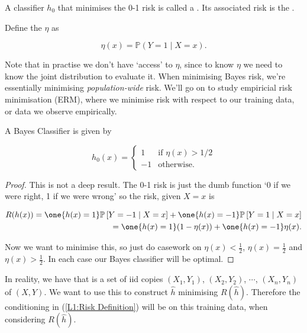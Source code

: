 \documentclass[11pt]{scrartcl}
\begin{document}
A classifier $h_0$ that minimises the 0-1 risk is called a . Its associated risk is the .

Define the  $\eta$ as 

\begin{equation}
    \eta(x) = \mathbb{P}(Y=1\mid X=x).
    \label{L1:Regression Function}
\end{equation}

Note that in practise we don't have `access' to $\eta$, since to know $\eta$ we need to know the joint distribution to evaluate it. When minimising Bayes risk, we're essentially minimising \textit{population-wide} risk. We'll go on to study empiricial risk minimisation (ERM), where we minimise risk with respect to our training data, or data we observe empirically.

\begin{theorem}
\label{not deep Bayes}
A Bayes Classifier is given by 

\begin{equation}
    h_0(x) = 
    \begin{cases} 
      1 & \text{if $\eta(x) > 1/2$} \\
      -1 & \text{otherwise.}
   \end{cases}
\label{L1:Bayes Example}
\end{equation}

\begin{proof}
This is not a deep result. The 0-1 risk is just the dumb function `0 if we were right, 1 if we were wrong' so the risk, given $X=x$ is

\begin{align*}
    R(h(x)) = \one{h(x) = 1} \P{Y = -1 \mid X = x} + \one{h(x) = -1} \P{Y = 1 \mid X = x} \\
    = \one{h(x) = 1} (1 - \eta(x)) + \one{h(x) = -1} \eta(x).
\end{align*}

Now we want to minimise this, so just do casework on $\eta(x) < \frac12$, $\eta(x) = \frac12$ and $\eta(x) > \frac12$. In each case our Bayes classifier will be optimal.
\end{proof}

\end{theorem}

In reality, we have  that is a set of iid copies $(X_1, Y_1)$, $(X_2, Y_2)$, $\cdots$, $(X_n, Y_n)$ of $(X, Y)$. We want to use this to construct $\hat{h}$ minimising $R(\hat{h})$. Therefore the conditioning in (\ref{L1:Risk Definition}) will be on this training data, when considering $R(\hat{h})$.
\end{document}
